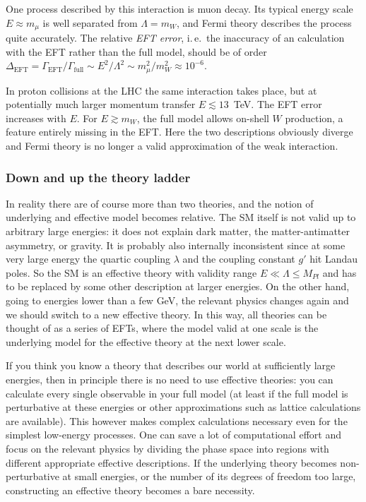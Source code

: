 One process described by this interaction is muon decay. Its typical
energy scale $E \approx m_\mu$ is well separated from $\Lambda = m_W$,
and Fermi theory describes the process quite accurately. The relative
\emph{EFT error}, i.\,e.\ the inaccuracy of an calculation with the
EFT rather than the full model, should be of order
$\Delta_\text{EFT} = \Gamma_\text{EFT} / \Gamma_\text{full} \sim E^2 /
\Lambda^2 \sim m_\mu^2 / m_W^2 \approx 10^{-6}$.

In proton collisions at the LHC the same interaction takes place, but
at potentially much larger momentum transfer $E \lesssim 13$~TeV. The
EFT error increases with $E$. For $E \gtrsim m_W$, the full model
allows on-shell $W$ production, a feature entirely missing in the
EFT. Here the two descriptions obviously diverge and Fermi theory is
no longer a valid approximation of the weak interaction.



\subsubsection{Down and up the theory ladder}

In reality there are of course more than two theories, and the notion
of underlying and effective model becomes relative. The SM itself is
not valid up to arbitrary large energies: it does not explain dark
matter, the matter-antimatter asymmetry, or gravity. It is probably
also internally inconsistent since at some very large energy the
quartic coupling $\lambda$ and the coupling constant $g'$ hit Landau
poles. So the SM is an effective theory with validity range
$E \ll \Lambda \le M_{Pl}$ and has to be replaced by some other
description at larger energies. On the other hand, going to energies
lower than a few GeV, the relevant physics changes again and we should
switch to a new effective theory. In this way, all theories can be
thought of as a series of EFTs, where the model valid at one scale is
the underlying model for the effective theory at the next lower scale.

If you think you know a theory that describes our world at
sufficiently large energies, then in principle there is no need to use
effective theories: you can calculate every single observable in your
full model (at least if the full model is perturbative at these
energies or other approximations such as lattice calculations are
available). This however makes complex calculations necessary even for
the simplest low-energy processes. One can save a lot of computational
effort and focus on the relevant physics by dividing the phase space
into regions with different appropriate effective descriptions. If the
underlying theory becomes non-perturbative at small energies, or the
number of its degrees of freedom too large, constructing an effective
theory becomes a bare necessity.

